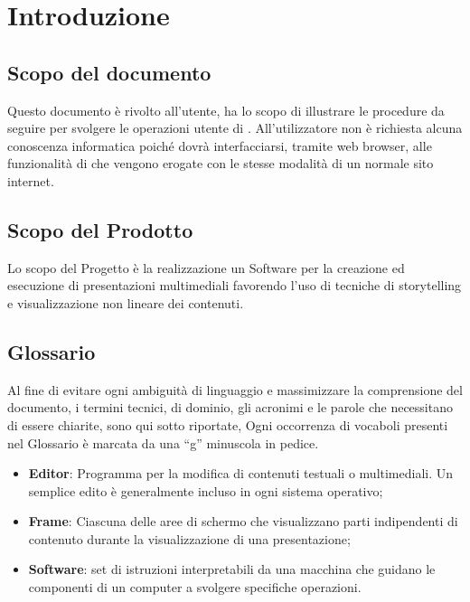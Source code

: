 \section{Introduzione}
\subsection{Scopo del documento}
Questo documento è rivolto all’utente, ha lo scopo di illustrare le procedure da seguire per svolgere le operazioni utente di \premi . All'utilizzatore non è richiesta alcuna conoscenza informatica poiché dovrà interfacciarsi, tramite web browser, alle funzionalità di \premi che vengono erogate con le stesse modalità di un normale sito internet.
\subsection{Scopo del Prodotto}
Lo scopo del Progetto è la realizzazione un Software per la creazione ed esecuzione di presentazioni multimediali favorendo l’uso di tecniche di storytelling e visualizzazione non lineare dei contenuti.
\subsection{Glossario}
Al fine di evitare ogni ambiguità di linguaggio e massimizzare la comprensione del documento, i termini tecnici, di dominio, gli acronimi e le parole che necessitano di essere chiarite, sono qui sotto riportate, Ogni occorrenza di vocaboli presenti nel Glossario è marcata da una “g” minuscola in pedice.
\begin{itemize}
\item \textbf{Editor}: Programma per la modifica di contenuti testuali o multimediali. Un semplice edito è generalmente incluso in ogni sistema operativo;
\item \textbf{Frame}: Ciascuna delle aree di schermo che visualizzano parti indipendenti di contenuto durante la visualizzazione di una presentazione;
\item \textbf{Software}: set di istruzioni interpretabili da una macchina che guidano le componenti di un computer a svolgere specifiche operazioni.

\end{itemize}



